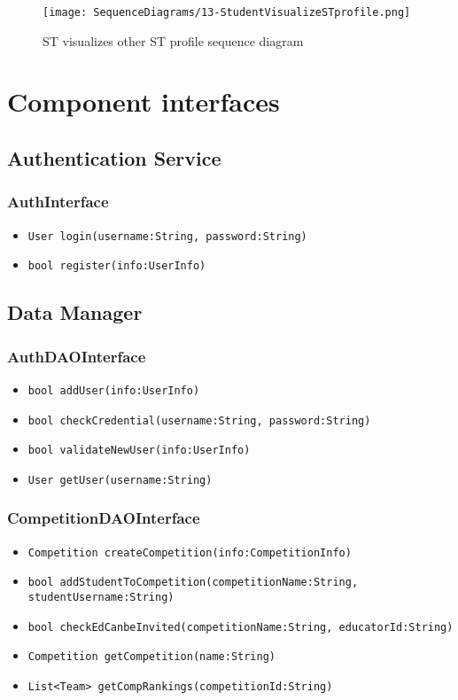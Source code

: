 \begin{figure}[H]
  \centering
  \texttt{[image: SequenceDiagrams/13-StudentVisualizeSTprofile.png]}
  \caption{ST visualizes other ST profile sequence diagram}
  \label{fig:st_visualizes_other_st_profile}
\end{figure}

\section{Component interfaces}
\label{s:component-interfaces}%


\subsection{Authentication Service}
\subsubsection{AuthInterface}
\begin{itemize}
    \item \texttt{User login(username:String, password:String)}%
    \item \texttt{bool register(info:UserInfo)} %
\end{itemize}

\subsection{Data Manager}
\subsubsection{AuthDAOInterface}
\begin{itemize}
    \item \texttt{bool addUser(info:UserInfo)}%
    \item \texttt{bool checkCredential(username:String, password:String)}%
    \item \texttt{bool validateNewUser(info:UserInfo)}%
    \item \texttt{User getUser(username:String)}%
\end{itemize}

\subsubsection{CompetitionDAOInterface}
\begin{itemize}
    \item \texttt{Competition createCompetition(info:CompetitionInfo)}%
    \item \texttt{bool addStudentToCompetition(competitionName:String, studentUsername:String)}
    \item \texttt{bool checkEdCanbeInvited(competitionName:String, educatorId:String)}%
    \item \texttt{Competition getCompetition(name:String)}%
    \item \texttt{List<Team> getCompRankings(competitionId:String)}
\end{itemize}


